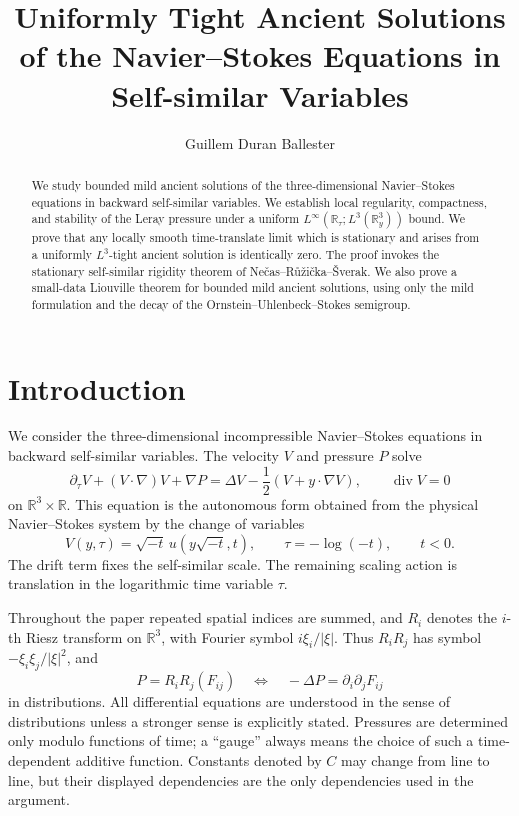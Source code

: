 \documentclass[11pt]{amsart}
\title[Uniformly tight ancient solutions]{Uniformly Tight Ancient Solutions of the Navier--Stokes Equations in Self-similar Variables}
\author{Guillem Duran Ballester}
\date{}
\theoremstyle{plain}
\theoremstyle{definition}
\theoremstyle{remark}
\numberwithin{equation}{section}
\begin{document}
\begin{abstract}
We study bounded mild ancient solutions of the three-dimensional
Navier--Stokes equations in backward self-similar variables.  We establish
local regularity, compactness, and stability of the Leray pressure under a
uniform \(L^\infty(\mathbb R_\tau;L^3(\mathbb R^3_y))\) bound.  We prove
that any locally smooth time-translate limit which is stationary and arises
from a uniformly \(L^3\)-tight ancient solution is identically zero.  The
proof invokes the stationary self-similar rigidity theorem of
Ne\v{c}as--R\r{u}\v{z}i\v{c}ka--\v{S}verak.
We also prove a small-data Liouville theorem for bounded mild ancient
solutions, using only the mild formulation and the decay of the
Ornstein--Uhlenbeck--Stokes semigroup.
\end{abstract}

\maketitle

\section{Introduction}

We consider the three-dimensional incompressible Navier--Stokes equations in
backward self-similar variables.  The velocity \(V\) and pressure \(P\) solve
\begin{equation}\label{eq:centered}
   \partial_\tau V+(V\cdot\nabla)V+\nabla P
   =
   \Delta V-\frac12(V+y\cdot\nabla V),
   \qquad \operatorname{div} V=0
\end{equation}
on \(\mathbb R^3\times\mathbb R\).  This equation is the autonomous form obtained from the
physical Navier--Stokes system by the change of variables
\[
   V(y,\tau)=\sqrt{-t}\,u(y\sqrt{-t},t),\qquad \tau=-\log(-t),
   \qquad t<0.
\]
The drift term fixes the self-similar scale.  The remaining scaling action is
translation in the logarithmic time variable \(\tau\).

Throughout the paper repeated spatial indices are summed, and \(R_i\) denotes
the \(i\)-th Riesz transform on \(\mathbb R^3\), with Fourier symbol
\(i\xi_i/|\xi|\).  Thus \(R_iR_j\) has symbol
\(-\xi_i\xi_j/|\xi|^2\), and
\[
   P=R_iR_j(F_{ij})
   \quad\Longleftrightarrow\quad
   -\Delta P=\partial_i\partial_jF_{ij}
\]
in distributions.  All differential equations are understood in the sense of
distributions unless a stronger sense is explicitly stated.  Pressures are
determined only modulo functions of time; a ``gauge'' always means the choice
of such a time-dependent additive function.  Constants denoted by \(C\) may
change from line to line, but their displayed dependencies are the only
dependencies used in the argument.
\end{document}
